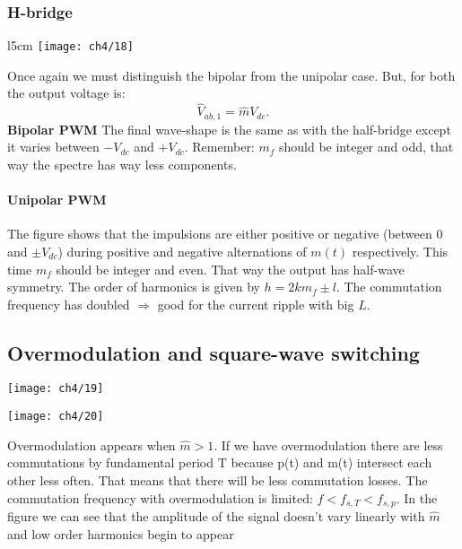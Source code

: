 		\subsubsection{H-bridge}
			\begin{wrapfigure}[16]{l}{5cm}
			\vspace{-5mm}
			\texttt{[image: ch4/18]}
			\end{wrapfigure}
			Once again we must distinguish the bipolar from the unipolar case. But, for both the output voltage is:
			\begin{equation}
				\hat{V}_{ab,1} = \hat{m}V_{dc}. 
			\end{equation}
			\textbf{Bipolar PWM} \qquad The final wave-shape is the same as with the half-bridge except it varies between $-V_{dc}$ and $+V_{dc}$. Remember: $m_{f}$ should be integer and odd, that way the spectre has way less components. 
			
			\paragraph{Unipolar PWM} \quad  The figure shows that the impulsions are either positive or negative (between 0 and $\pm V_{dc}$) during positive and negative alternations of $m(t)$ respectively. This time $m_f$ should be integer and even. That way the output has half-wave symmetry. The order of harmonics is given by $h=2km_f \pm l$. The commutation frequency has doubled $\Rightarrow$ good for the current ripple with big $L$. 
			
	\subsection{Overmodulation and square-wave switching}
\begin{center}
		\begin{minipage}{0.45\textwidth}
			\texttt{[image: ch4/19]}
		\end{minipage}
		\begin{minipage}{0.45\textwidth}
			\texttt{[image: ch4/20]}
			\label{fig:4.18}
		\end{minipage}
\end{center}

		Overmodulation appears when $\hat{m}>1$. If we have overmodulation there are less commutations by fundamental period T because p(t) and m(t) intersect each other less often. That means that there will be less commutation losses. The commutation frequency with overmodulation is limited: $f < f_{s,T} < f_{s,p}$. In the figure we can see that the amplitude of the signal doesn't vary linearly with $\hat{m}$ and low order harmonics begin to appear 
		
